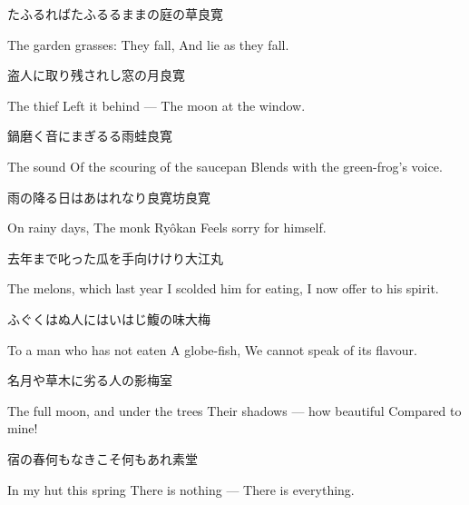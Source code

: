 \begin{haiku}
    {\FH たふるればたふるるままの庭の草}\hfill{\FH 良寛}

    \vin{} The garden grasses:
    \vin{} \vin{} They fall,
    \vin{} \vin{} \vin{} And lie as they fall.
\end{haiku}

\begin{haiku}
    {\FH 盗人に取り残されし窓の月}\hfill{\FH 良寛}

    \vin{} The thief
    \vin{} \vin{} Left it behind ---
    \vin{} \vin{} \vin{} The moon at the window.
\end{haiku}

\begin{haiku}
    {\FH 鍋磨く音にまぎるる雨蛙}\hfill{\FH 良寛}

    \vin{} The sound
    \vin{} \vin{} Of the scouring of the saucepan
    \vin{} \vin{} \vin{} Blends with the green-frog's voice.
\end{haiku}

\begin{haiku}
    {\FH 雨の降る日はあはれなり良寛坊}\hfill{\FH 良寛}

    \vin{} On rainy days,
    \vin{} \vin{} The monk Ry\^okan
    \vin{} \vin{} \vin{} Feels sorry for himself.
\end{haiku}

\begin{haiku}
    {\FH 去年まで叱った瓜を手向けけり}\hfill{\FH 大江丸}

    \vin{} The melons, which last year
    \vin{} \vin{} I scolded him for eating,
    \vin{} \vin{} \vin{} I now offer to his spirit.
\end{haiku}

\begin{haiku}
    {\FH ふぐくはぬ人にはいはじ鰒の味}\hfill{\FH 大梅}

    \vin{} To a man who has not eaten
    \vin{} \vin{} A globe-fish,
    \vin{} \vin{} \vin{} We cannot speak of its flavour.
\end{haiku}

\begin{haiku}
    {\FH 名月や草木に劣る人の影}\hfill{\FH 梅室}

    \vin{} The full moon, and under the trees
    \vin{} \vin{} Their shadows --- how beautiful
    \vin{} \vin{} \vin{} Compared to mine!
\end{haiku}

\begin{haiku}
    {\FH 宿の春何もなきこそ何もあれ}\hfill{\FH 素堂}

    \vin{} In my hut this spring
    \vin{} \vin{} There is nothing ---
    \vin{} \vin{} \vin{} There is everything.
\end{haiku}


